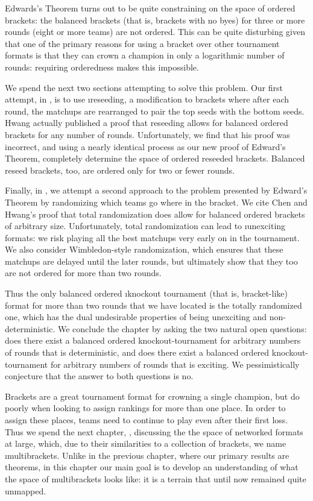{    Edwards's Theorem turns out to be quite constraining on the space of ordered brackets: the balanced brackets (that is, brackets with no byes) for three or more rounds (eight or more teams) are not ordered. This can be quite disturbing given that one of the primary reasons for using a bracket over other tournament formats is that they can crown a champion in only a logarithmic number of rounds: requiring orderedness makes this impossible. 

    We spend the next two sections attempting to solve this problem. Our first attempt, in , is to use \i{reseeding}, a modification to brackets where after each round, the matchups are rearranged to pair the top seeds with the bottom seeds. Hwang \cite{reseeding} actually published a proof that reseeding allows for balanced ordered brackets for any number of rounds. Unfortunately, we find that his proof was incorrect, and using a nearly identical process as our new proof of Edward's Theorem, completely determine the space of ordered reseeded brackets. Balanced reseed brackets, too, are ordered only for two or fewer rounds.

    Finally, in , we attempt a second approach to the problem presented by Edward's Theorem by randomizing which teams go where in the bracket. We cite Chen and Hwang's \cite{totally_random_balanced} proof that total randomization does allow for balanced ordered brackets of arbitrary size. Unfortunately, total randomization can lead to \i{unexciting} formats: we risk playing all the best matchups very early on in the tournament. We also consider Wimbledon-style randomization, which ensures that these matchups are delayed until the later rounds, but ultimately show that they too are not ordered for more than two rounds.

    Thus the only balanced ordered \i{knockout tournament} (that is, bracket-like) format for more than two rounds that we have located is the totally randomized one, which has the dual undesirable properties of being unexciting and non-deterministic. We conclude the chapter by asking the two natural open questions: does there exist a balanced ordered knockout-tournament for arbitrary numbers of rounds that is deterministic, and does there exist a balanced ordered knockout-tournament for arbitrary numbers of rounds that is exciting. We pessimistically conjecture that the answer to both questions is no.

    Brackets are a great tournament format for crowning a single champion, but do poorly when looking to assign rankings for more than one place. In order to assign these places, teams need to continue to play even after their first loss. Thus we spend the next chapter, , discussing the the space of networked formats at large, which, due to their similarities to a collection of brackets, we name \i{multibrackets}. Unlike in the previous chapter, where our primary results are theorems, in this chapter our main goal is to develop an understanding of what the space of multibrackets looks like: it is a terrain that until now remained quite unmapped.

}
